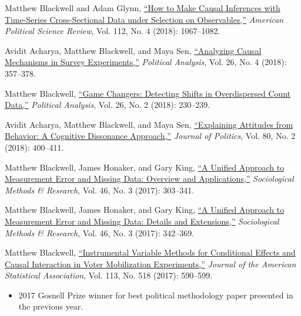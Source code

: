 \documentclass[11pt,article,oneside]{memoir}
\begin{document}
\begin{etaremune}[  itemsep = 1em,
  topsep = 0em,
  partopsep=0in,
  leftmargin=1.5em]
\item Matthew Blackwell and Adam Glynn, \href{http://www.mattblackwell.org/files/papers/causal-tscs.pdf}{``How to Make Causal Inferences with Time-Series
  Cross-Sectional Data under Selection on Observables,''} \emph{American Political Science Review}, Vol. 112, No. 4 (2018): 1067--1082.

\item Avidit Acharya, Matthew Blackwell, and Maya Sen, \href{https://mattblackwell.org/files/papers/survey-mechanisms.pdf}{``Analyzing Causal Mechanisms in Survey Experiments,''} \emph{Political Analysis}, Vol. 26, No. 4 (2018): 357--378.
  
\item Matthew Blackwell, \href{http://www.mattblackwell.org/files/papers/gamechangers-letter.pdf}{``Game Changers: Detecting Shifts in Overdispersed Count Data,''} \emph{Political Analysis}, Vol. 26, No. 2 (2018): 230--239.

\item Avidit Acharya, Matthew Blackwell, and Maya Sen, \href{http://www.mattblackwell.org/files/papers/attitudes.pdf}{``Explaining Attitudes from Behavior: A Cognitive Dissonance Approach,''} \emph{Journal of Politics}, Vol. 80, No. 2 (2018): 400--411.

\item Matthew Blackwell, James Honaker, and Gary King, \href{http://gking.harvard.edu/files/measure.pdf}{``A Unified Approach to Measurement Error and
    Missing Data: Overview and Applications,''} \emph{Sociological Methods \& Research}, Vol. 46, No. 3 (2017): 303--341.
  
\item Matthew Blackwell, James Honaker, and Gary King, \href{http://gking.harvard.edu/files/measured.pdf}{``A Unified Approach to Measurement Error and
    Missing Data: Details and Extensions,''} \emph{Sociological Methods \& Research}, Vol. 46, No. 3 (2017): 342--369.
  
\item Matthew Blackwell, \href{http://www.mattblackwell.org/files/papers/joint-iv.pdf}{``Instrumental Variable Methods for Conditional Effects and Causal Interaction in Voter Mobilization Experiments,''} \emph{Journal of the American Statistical Association}, Vol. 113, No. 518 (2017): 590--599. 
\begin{itemize}[topsep=0em]
\item  2017 Gosnell Prize winner for best political methodology paper presented in the previous year. %
\end{itemize}


\end{etaremune}
\end{document}
